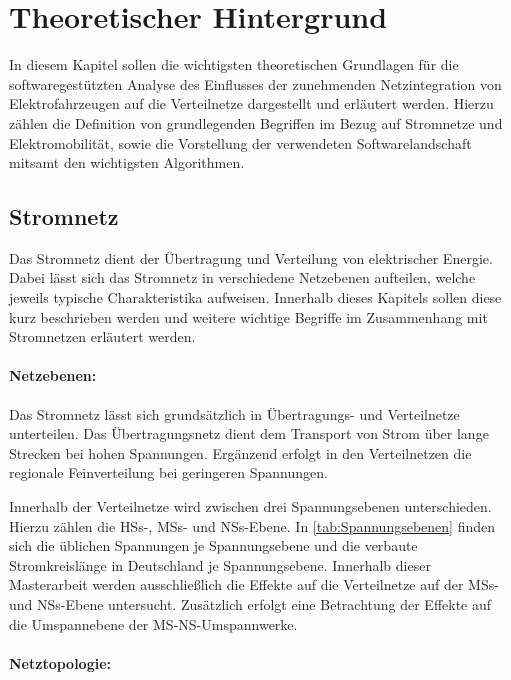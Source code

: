 \section{Theoretischer Hintergrund}

In diesem Kapitel sollen die wichtigsten theoretischen Grundlagen für die softwaregestützten Analyse des Einflusses der zunehmenden Netzintegration von Elektrofahrzeugen auf die Verteilnetze dargestellt und erläutert werden.
Hierzu zählen die Definition von grundlegenden Begriffen im Bezug auf Stromnetze und Elektromobilität, sowie die Vorstellung der verwendeten Softwarelandschaft mitsamt den wichtigsten Algorithmen.


\subsection{Stromnetz}

Das Stromnetz dient der Übertragung und Verteilung von elektrischer Energie. \cite{Paschotta2020}
Dabei lässt sich das Stromnetz in verschiedene Netzebenen aufteilen, welche jeweils typische Charakteristika aufweisen.
Innerhalb dieses Kapitels sollen diese kurz beschrieben werden und weitere wichtige Begriffe im Zusammenhang mit Stromnetzen erläutert werden.


\paragraph{Netzebenen:}

Das Stromnetz lässt sich grundsätzlich in Übertragungs- und Verteilnetze unterteilen.
Das Übertragungsnetz dient dem Transport von Strom über lange Strecken bei hohen Spannungen.
Ergänzend erfolgt in den Verteilnetzen die regionale Feinverteilung bei geringeren Spannungen. \cite{Agora2019}\medskip

Innerhalb der Verteilnetze wird zwischen drei Spannungsebenen unterschieden. Hierzu zählen die \glspl{HS}-, \glspl{MS}- und \glspl{NS}-Ebene.
In \autoref{tab:Spannungsebenen} finden sich die üblichen Spannungen je Spannungsebene und die verbaute Stromkreislänge in Deutschland je Spannungsebene.
Innerhalb dieser Masterarbeit werden ausschließlich die Effekte auf die Verteilnetze auf der \glspl{MS}- und \glspl{NS}-Ebene untersucht.
Zusätzlich erfolgt eine Betrachtung der Effekte auf die Umspannebene der \gls{MS}-\gls{NS}-Umspannwerke.




\paragraph{Netztopologie:}

